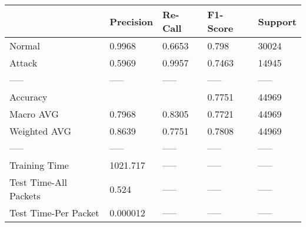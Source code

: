\begin{tabular}{lllll}
\toprule
{} & Precision & Re-Call & F1-Score & Support \\
\midrule
Normal                &    0.9968 &  0.6653 &    0.798 &   30024 \\
Attack                &    0.5969 &  0.9957 &   0.7463 &   14945 \\
-----                 &     ----- &   ----- &    ----- &   ----- \\
Accuracy              &           &         &   0.7751 &   44969 \\
Macro AVG             &    0.7968 &  0.8305 &   0.7721 &   44969 \\
Weighted AVG          &    0.8639 &  0.7751 &   0.7808 &   44969 \\
-----                 &     ----- &   ----- &    ----- &   ----- \\
Training Time         &  1021.717 &   ----- &    ----- &   ----- \\
Test Time-All Packets &     0.524 &   ----- &    ----- &   ----- \\
Test Time-Per Packet  &  0.000012 &   ----- &    ----- &   ----- \\
\bottomrule
\end{tabular}
